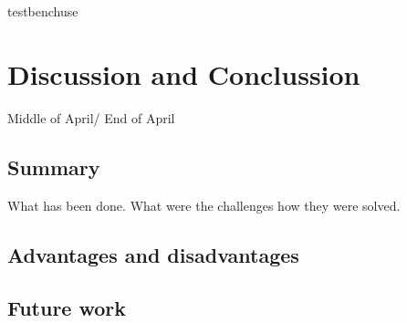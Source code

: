 \documentclass[12pt,a4paper,english%
]{tutthesis}
\begin{document}

 {testbenchuse}   	
  

 \section {Discussion and Conclussion}
 	Middle of April/ End of April
 	\subsection {Summary}
 	  What has been done. What were the challenges how they were solved.
 	\subsection {Advantages and disadvantages}
 	\subsection {Future work}
 	
\end{document}
